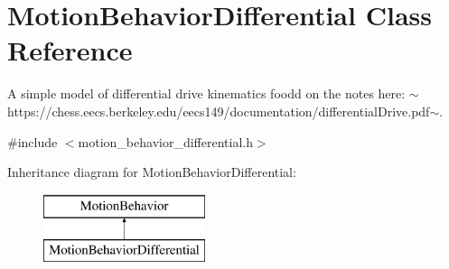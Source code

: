 \hypertarget{class_motion_behavior_differential}{}\section{Motion\+Behavior\+Differential Class Reference}
\label{class_motion_behavior_differential}


A simple model of differential drive kinematics foodd on the notes here\+: $\sim$https\+://chess.eecs.\+berkeley.\+edu/eecs149/documentation/differential\+Drive.\+pdf$\sim$.  




{\ttfamily \#include $<$motion\+\_\+behavior\+\_\+differential.\+h$>$}

Inheritance diagram for Motion\+Behavior\+Differential\+:\begin{figure}[H]
\begin{center}
\leavevmode
\includegraphics[height=2.000000cm]{class_motion_behavior_differential}
\end{center}
\end{figure}
